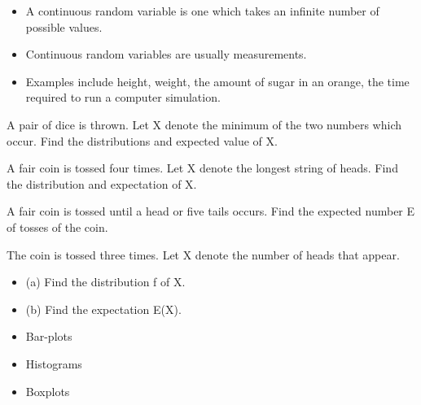 \documentclass[12pt]{report}
\begin{document}
{{%
{\LARGE
	\begin{itemize} \item
		A continuous random variable is one which takes an infinite number of possible values. \item Continuous random variables are usually measurements. \item Examples include height, weight, the amount of sugar in an orange, the time required to run a computer simulation. \end{itemize}
	
}



A pair of dice is thrown. Let X denote the minimum of the two numbers which occur.
Find the distributions and expected value of X.



A fair coin is tossed four times.
Let X denote the longest string of heads.
Find the distribution and expectation of X.


A fair coin is tossed until a head or five tails occurs.
Find the expected number E of tosses of the coin.



The coin is tossed three times. Let X denote the number of
heads that appear.
\begin{itemize}
	\item (a) Find the distribution f of X.
	\item (b) Find the expectation E(X).
\end{itemize}



\begin{itemize}
	\item Bar-plots
	\item Histograms
	\item Boxplots
	

\end{itemize}}}
\end{document}
